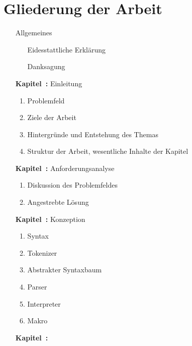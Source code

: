 \section{Gliederung der Arbeit}
\label{sec:gliederung_der_arbeit}
  \begin{enumerate}[
    labelindent=*,
    leftmargin=\widthof{\textbf{~~Kapitel~0:~}},
    label=\arabic*.
  ]
    \item[]
      Allgemeines
      \begin{enumerate}[label=\theenumi\arabic*.]
          \item[]
            Eidesstattliche Erklärung
          \item[]
            Danksagung
      \end{enumerate}
    \item[\textbf{Kapitel~\arabic{enumi}:}]
      Einleitung
      \begin{enumerate}[label=\theenumi\arabic*.]
          \item Problemfeld
          \item Ziele der Arbeit
          \item Hintergründe und Entstehung des Themas
          \item Struktur der Arbeit, wesentliche Inhalte der Kapitel
      \end{enumerate}
    \item[\textbf{Kapitel~\arabic{enumi}:}]
      Anforderungsanalyse
      \begin{enumerate}[label=\theenumi\arabic*.]
          \item Diskussion des Problemfeldes
          \item Angestrebte Lösung
      \end{enumerate}
    \item[\textbf{Kapitel~\arabic{enumi}:}]
      Konzeption
      \begin{enumerate}[label=\theenumi\arabic*.]
          \item Syntax
          \item Tokenizer
          \item Abstrakter Syntaxbaum
          \item Parser
          \item Interpreter
          \item Makro
      \end{enumerate}
    \item[\textbf{Kapitel~\arabic{enumi}:}]

\end{enumerate}
